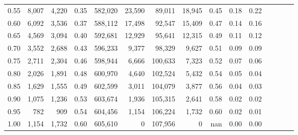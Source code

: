 \begin{tabular}{rrrcrrrrrrrrrrr}
0.55 &    8,007 &   4,220 &                                       0.35 &  582,020 &   23,590 &   89,011 &   18,945 &  0.45 &  0.18 &                         0.22 \\
0.60 &    6,092 &   3,536 &                                       0.37 &  588,112 &   17,498 &   92,547 &   15,409 &  0.47 &  0.14 &                         0.16 \\
0.65 &    4,569 &   3,094 &                                       0.40 &  592,681 &   12,929 &   95,641 &   12,315 &  0.49 &  0.11 &                         0.12 \\
0.70 &    3,552 &   2,688 &                                       0.43 &  596,233 &    9,377 &   98,329 &    9,627 &  0.51 &  0.09 &                         0.09 \\
0.75 &    2,711 &   2,304 &                                       0.46 &  598,944 &    6,666 &  100,633 &    7,323 &  0.52 &  0.07 &                         0.06 \\
0.80 &    2,026 &   1,891 &                                       0.48 &  600,970 &    4,640 &  102,524 &    5,432 &  0.54 &  0.05 &                         0.04 \\
0.85 &    1,629 &   1,555 &                                       0.49 &  602,599 &    3,011 &  104,079 &    3,877 &  0.56 &  0.04 &                         0.03 \\
0.90 &    1,075 &   1,236 &                                       0.53 &  603,674 &    1,936 &  105,315 &    2,641 &  0.58 &  0.02 &                         0.02 \\
0.95 &      782 &     909 &                                       0.54 &  604,456 &    1,154 &  106,224 &    1,732 &  0.60 &  0.02 &                         0.01 \\
1.00 &    1,154 &   1,732 &                                       0.60 &  605,610 &        0 &  107,956 &        0 &   nan &  0.00 &                         0.00 \\
\bottomrule
\end{tabular}
